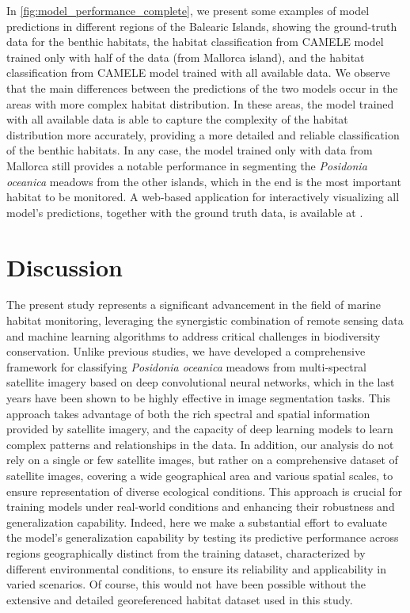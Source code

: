In \cref{fig:model_performance_complete}, we present some examples of model
predictions in different regions of the Balearic Islands, showing the
ground-truth data for the benthic habitats, the habitat classification from
CAMELE model trained only with half of the data (from Mallorca island), and the
habitat classification from CAMELE model trained with all available data. We
observe that the main differences between the predictions of the two models
occur in the areas with more complex habitat distribution. In these areas, the
model trained with all available data is able to capture the complexity of the
habitat distribution more accurately, providing a more detailed and reliable
classification of the benthic habitats. In any case, the model trained only
with data from Mallorca still provides a notable performance in segmenting the
\textit{Posidonia oceanica} meadows from the other islands, which in the end is
the most important habitat to be monitored. A web-based application for
interactively visualizing all model's predictions, together with the ground
truth data, is available at \cite{Webpage_camele}.

\section{Discussion}

The present study represents a significant advancement in the field of marine
habitat
monitoring, leveraging the synergistic combination of remote sensing data and
machine learning algorithms to address critical challenges in biodiversity
conservation. Unlike previous studies, we have developed a comprehensive
framework for classifying \textit{Posidonia oceanica} meadows from
multi-spectral satellite imagery based on deep convolutional neural networks,
which in the last years have been shown to be highly effective in image
segmentation tasks. This approach takes advantage of both the rich spectral
and spatial information provided by satellite imagery, and the capacity of deep
learning models to learn complex patterns and relationships in the data. In
addition, our analysis do not rely on a single or few satellite images, but
rather on a comprehensive dataset of satellite images, covering a wide
geographical area and various spatial scales, to ensure representation of
diverse ecological conditions. This approach is crucial for training models
under real-world conditions and enhancing their robustness and generalization
capability. Indeed, here we make a substantial effort to evaluate the model's
generalization capability by testing its predictive performance across regions
geographically distinct from the training dataset, characterized by different
environmental conditions, to ensure its reliability and applicability in varied
scenarios. Of course, this would not have been possible without the extensive
and detailed georeferenced habitat dataset used in this study.

